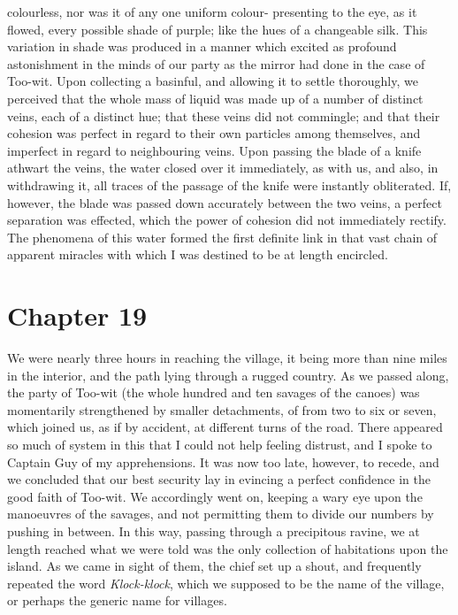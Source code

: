 colourless, nor was it of any one uniform colour- presenting to the eye, as it
flowed, every possible shade of purple; like the hues of a changeable silk. This
variation in shade was produced in a manner which excited as profound
astonishment in the minds of our party as the mirror had done in the case of
Too-wit. Upon collecting a basinful, and allowing it to settle thoroughly, we
perceived that the whole mass of liquid was made up of a number of distinct
veins, each of a distinct hue; that these veins did not commingle; and that
their cohesion was perfect in regard to their own particles among themselves,
and imperfect in regard to neighbouring veins. Upon passing the blade of a knife
athwart the veins, the water closed over it immediately, as with us, and also,
in withdrawing it, all traces of the passage of the knife were instantly
obliterated. If, however, the blade was passed down accurately between the two
veins, a perfect separation was effected, which the power of cohesion did not
immediately rectify. The phenomena of this water formed the first definite link
in that vast chain of apparent miracles with which I was destined to be at
length encircled. 

\section{Chapter 19}
We were nearly three hours in reaching the village, it being more than nine
miles in the interior, and the path lying through a rugged country. As we passed
along, the party of Too-wit (the whole hundred and ten savages of the canoes)
was momentarily strengthened by smaller detachments, of from two to six or
seven, which joined us, as if by accident, at different turns of the road. There
appeared so much of system in this that I could not help feeling distrust, and I
spoke to Captain Guy of my apprehensions. It was now too late, however, to
recede, and we concluded that our best security lay in evincing a perfect
confidence in the good faith of Too-wit. We accordingly went on, keeping a wary
eye upon the manoeuvres of the savages, and not permitting them to divide our
numbers by pushing in between. In this way, passing through a precipitous
ravine, we at length reached what we were told was the only collection of
habitations upon the island. As we came in sight of them, the chief set up a
shout, and frequently repeated the word \emph{Klock-klock}, which we supposed to
be the name of the village, or perhaps the generic name for villages. 

